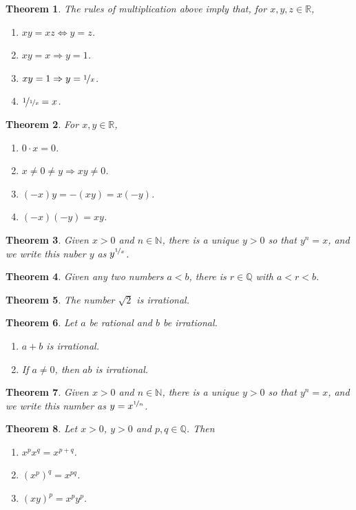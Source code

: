 \documentclass{article}
\theoremstyle{sltheorem}
\newtheorem{theorem}{Theorem}[section]
\newcommand{\R}{\mathbb{R}}
\newcommand{\N}{\mathbb{N}}
\begin{document}
\begin{theorem}
    The rules of multiplication above imply that, for $x, y, z \in \R$,
    \begin{enumerate}
        \item $xy=xz\Leftrightarrow y=z$.
        \item $xy=x\Rightarrow y=1$.
        \item $xy=1\Rightarrow y=\nicefrac{1}{x}$.
        \item $\nicefrac{1}{\nicefrac{1}{x}}=x$.
    \end{enumerate}
\end{theorem}
\begin{theorem}
    For $x,y\in\R$,
    \begin{enumerate}
        \item $0\cdot x = 0$.
        \item $x\not=0\not=y\Rightarrow xy\not=0$.
        \item $(-x)y=-(xy)=x(-y)$.
        \item $(-x)(-y)=xy$.
    \end{enumerate}
\end{theorem}
\begin{theorem}
    Given $x>0$ and $n\in\N$, there is a unique $y>0$ so that $y^n=x$, and we write this nuber $y$ as $y^{\nicefrac{1}{x}}$.
\end{theorem}
\begin{theorem}
    Given any two numbers $a<b$, there is $r\in\mathbb{Q}$ with $a<r<b$.
\end{theorem}
\begin{theorem}
    The number $\sqrt{2}$ is irrational.
\end{theorem}
\begin{theorem}
    Let $a$ be rational and $b$ be irrational.
    \begin{enumerate}
        \item $a+b$ is irrational.
        \item If $a\not=0$, then $ab$ is irrational.
    \end{enumerate}
\end{theorem}
\begin{theorem}
    Given $x>0$ and $n\in\N$, there is a unique $y>0$ so that $y^n=x$, and we write this number as $y=x^{\nicefrac{1}{n}}$.
\end{theorem}
\begin{theorem}
    Let $x>0$, $y>0$ and $p,q\in\mathbb{Q}$. Then
    \begin{enumerate}
        \item $x^px^q=x^{p+q}$.
        \item $(x^p)^q=x^{pq}$.
        \item $(xy)^p=x^py^p$.
    \end{enumerate}
\end{theorem}
\end{document}
